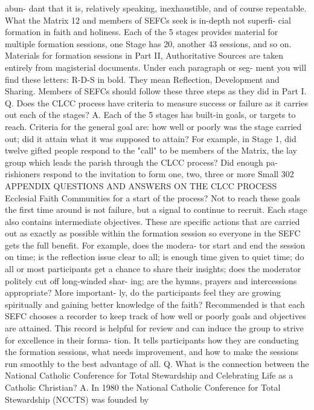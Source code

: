 \documentclass[oneside]{book}
\begin{document}
abun- dant that it is, relatively speaking, inexhaustible, and of course
repeatable. What the Matrix 12 and members of SEFCs seek is in-depth not
superfi- cial formation in faith and holiness. Each of the 5 stages provides
material for multiple formation sessions, one Stage has 20, another 43 sessions,
and so on.  Materials for formation sessions in Part II, Authoritative Sources
are taken entirely from magisterial documents. Under each paragraph or seg- ment
you will find these letters: R-D-S in bold. They mean Reflection, Development
and Sharing. Members of SEFCs should follow these three steps as they did in
Part I.  Q. Does the CLCC process have criteria to measure success or failure as
it carries out each of the stages?  A. Each of the 5 stages has built-in goals,
or targets to reach. Criteria for the general goal are: how well or poorly was
the stage carried out; did it attain what it was supposed to attain? For
example, in Stage 1, did twelve gifted people respond to the "call" to be
members of the Matrix, the lay group which leads the parish through the CLCC
process? Did enough pa- rishioners respond to the invitation to form one, two,
three or more Small 302 APPENDIX QUESTIONS AND ANSWERS ON THE CLCC PROCESS
Ecclesial Faith Communities for a start of the process? Not to reach these goals
the first time around is not failure, but a signal to continue to recruit. Each
stage also contains intermediate objectives. These are specific actions that are
carried out as exactly as possible within the formation session so everyone in
the SEFC gets the full benefit. For example, does the modera- tor start and end
the session on time; is the reflection issue clear to all; is enough time given
to quiet time; do all or most participants get a chance to share their insights;
does the moderator politely cut off long-winded shar- ing; are the hymns,
prayers and intercessions appropriate? More important- ly, do the participants
feel they are growing spiritually and gaining better knowledge of the faith?
Recommended is that each SEFC chooses a recorder to keep track of how well or
poorly goals and objectives are attained. This record is helpful for review and
can induce the group to strive for excellence in their forma- tion. It tells
participants how they are conducting the formation sessions, what needs
improvement, and how to make the sessions run smoothly to the best advantage of
all.  Q. What is the connection between the National Catholic Conference for
Total Stewardship and Celebrating Life as a Catholic Christian?  A. In 1980 the
National Catholic Conference for Total Stewardship (NCCTS) was founded by
\end{document}
